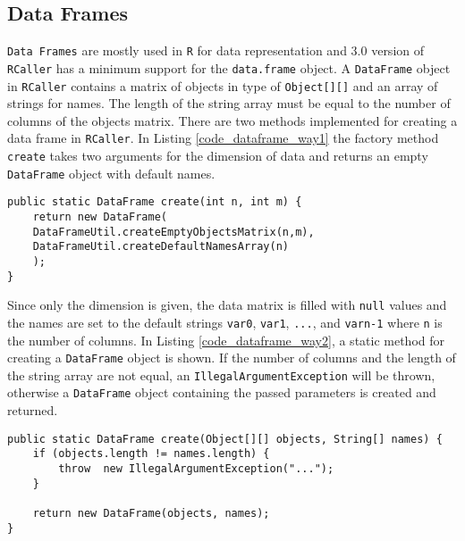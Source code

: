 \documentclass[10pt,a4paper, final, oneside]{article}
\begin{document}
\subsection{Data Frames}
\label{sec:data_frames}
\texttt{Data Frames} are mostly used in \texttt{R} for data representation and $3.0$ version of \texttt{RCaller} has a minimum support for the \texttt{data.frame} object. A \texttt{DataFrame} object in \texttt{RCaller} contains a matrix of objects in type of \texttt{Object[][]} and an array of strings for names. The length of the string array must be equal to the number of columns of the objects matrix. There are two methods implemented for creating a data frame in \texttt{RCaller}. In Listing \ref{code_dataframe_way1} the factory method \texttt{create} takes two arguments for the dimension of data and returns an empty \texttt{DataFrame} object with default names. 


\begin{minipage}{\linewidth}
\begin{lstlisting}[caption=Default DataFrame Creator,label=code_dataframe_way1]
public static DataFrame create(int n, int m) {
    return new DataFrame(
    DataFrameUtil.createEmptyObjectsMatrix(n,m), 
    DataFrameUtil.createDefaultNamesArray(n)
    );
}
\end{lstlisting}
\end{minipage}

Since only the dimension is given, the data matrix is filled with \texttt{null} values and the names are set to the default strings \texttt{var0}, \texttt{var1}, \texttt{...}, and \texttt{varn-1} where \texttt{n} is the number of columns. In Listing \ref{code_dataframe_way2}, a static method for creating a \texttt{DataFrame} object is shown. If the number of columns and the length of the string array are not equal, an \texttt{IllegalArgumentException} will be thrown, otherwise a \texttt{DataFrame} object containing the passed parameters is created and returned.


\begin{minipage}{\linewidth}
\begin{lstlisting}[caption=Custom DataFrame Creator, label=code_dataframe_way2]
public static DataFrame create(Object[][] objects, String[] names) {
    if (objects.length != names.length) {
        throw  new IllegalArgumentException("...");
    }

    return new DataFrame(objects, names);
}
\end{lstlisting}
\end{minipage}
\end{document}
